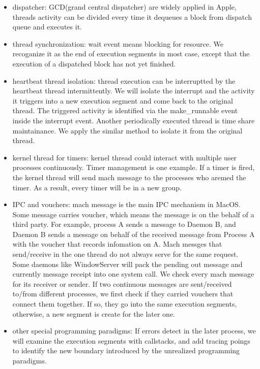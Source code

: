 \begin{itemize}
\item dispatcher: GCD(grand central dispatcher) are widely applied in Apple, threads activity can be divided every time it dequeues a block from dispatch queue and executes it.
\item thread synchronization: wait event means blocking for resource. We recoganize it as the end of execution segments in most case, except that the execution of a dispatched block has not yet finished.
\item heartbeat thread isolation: thread execution can be interruptted by the heartbeat thread intermittently. We will isolate the interrupt and the activity it triggers into a new execution segment and come back to the original thread. The triggered activity is identified via the make\_runnable event inside the interrupt event. Another periodically executed thread is time share maintainance. We apply the similar method to isolate it from the original thread.
\item kernel thread for timers: kernel thread could interact with multiple user processes continuously. Timer management is one example. If a timer is fired, the kernel thread will send mach message to the processes who aremed the timer. As a result, every timer will be in a new group.
\item IPC and vouchers: mach message is the main IPC mechanism in MacOS. Some message carries voucher, which means the message is on the behalf of a third party. For example, process A sends a message to Daemon B, and Daemon B sends a message on behalf of the received message from Process A with the voucher that records infomation on A. Mach messges that send/receive in the one thread do not always serve for the same request. Some daemons like WindowServer will pack the pending out message and currently message receipt into one system call. We check every mach message for its receiver or sender. If two continuous messages are sent/received to/from different processes, we first check if they carried vouchers that connect them together. If so, they go into the same execution segments, otherwise, a new segment is create for the later one. 
\item other special programming paradigms: If errors detect in the later process, we will examine the execution segments with callstacks, and add tracing poings to identify the new boundary introduced by the unrealized programming paradigms. 

\end{itemize}
